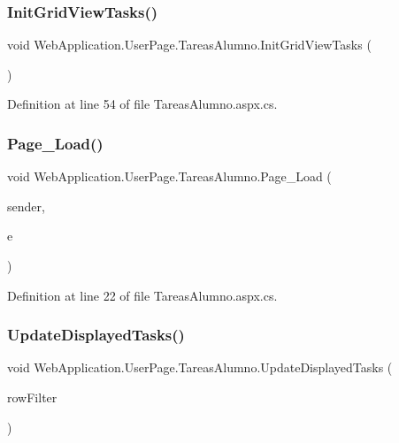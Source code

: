\subsubsection{\texorpdfstring{InitGridViewTasks()}{InitGridViewTasks()}}
{\footnotesize\ttfamily void Web\+Application.\+User\+Page.\+Tareas\+Alumno.\+Init\+Grid\+View\+Tasks (\begin{DoxyParamCaption}{ }\end{DoxyParamCaption})\hspace{0.3cm}{\ttfamily [private]}}



Definition at line 54 of file Tareas\+Alumno.\+aspx.\+cs.

\mbox{\label{classWebApplication_1_1UserPage_1_1TareasAlumno_a84541b38d186ebdbd9e5057e66f12360}} 
\subsubsection{\texorpdfstring{Page\_Load()}{Page\_Load()}}
{\footnotesize\ttfamily void Web\+Application.\+User\+Page.\+Tareas\+Alumno.\+Page\+\_\+\+Load (\begin{DoxyParamCaption}\item[{object}]{sender,  }\item[{Event\+Args}]{e }\end{DoxyParamCaption})\hspace{0.3cm}{\ttfamily [protected]}}



Definition at line 22 of file Tareas\+Alumno.\+aspx.\+cs.

\mbox{\label{classWebApplication_1_1UserPage_1_1TareasAlumno_ad2e2604904288558892729f8b67954b3}} 
\subsubsection{\texorpdfstring{UpdateDisplayedTasks()}{UpdateDisplayedTasks()}}
{\footnotesize\ttfamily void Web\+Application.\+User\+Page.\+Tareas\+Alumno.\+Update\+Displayed\+Tasks (\begin{DoxyParamCaption}\item[{string}]{row\+Filter }\end{DoxyParamCaption})\hspace{0.3cm}{\ttfamily [private]}}



